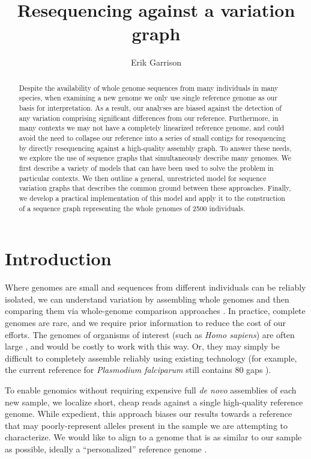 \documentclass{article}
\begin{document}
\title{Resequencing against a variation graph}

\author{Erik Garrison}

\maketitle

\begin{abstract}
Despite the availability of whole genome sequences from many individuals in many species, when examining a new genome we only use single reference genome as our basis for interpretation.
As a result, our analyses are biased against the detection of any variation comprising significant differences from our reference.
Furthermore, in many contexts we may not have a completely linearized reference genome, and could avoid the need to collapse our reference into a series of small contigs for resequencing by directly resequencing against a high-quality assembly graph.
To answer these needs, we explore the use of sequence graphs that simultaneously describe many genomes.
We first describe a variety of models that can have been used to solve the problem in particular contexts.
We then outline a general, unrestricted model for sequence variation graphs that describes the common ground between these approaches.
Finally, we develop a practical implementation of this model and apply it to the construction of a sequence graph representing the whole genomes of 2500 individuals.
\end{abstract}

\section{Introduction}

Where genomes are small and sequences from different individuals can be reliably isolated, we can understand variation by assembling whole genomes and then comparing them via whole-genome comparison approaches \cite{mummer}.
In practice, complete genomes are rare, and we require prior information to reduce the cost of our efforts.
The genomes of organisms of interest (such as \emph{Homo sapiens}) are often large \cite{pmid11237011}, and would be costly to work with this way.
Or, they may simply be difficult to completely assemble reliably using existing technology (for example, the current reference for \emph{Plasmodium falciparum} still contains 80 gaps \cite{pfalciparum, pfalciparumweb}).

To enable genomics without requiring expensive full \emph{de novo} assemblies of each new sample, we localize short, cheap reads against a single high-quality reference genome.
While expedient, this approach biases our results towards a reference that may poorly-represent alleles present in the sample we are attempting to characterize.
We would like to align to a genome that is as similar to our sample as possible, ideally a ``personalized'' reference genome \cite{Yuan_2012}.
\end{document}
